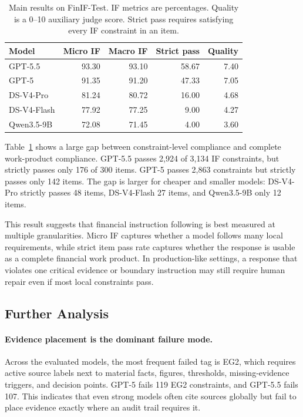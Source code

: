 \documentclass[11pt]{article}
\begin{document}
\begin{table}[t]
\centering
\small
\begin{tabular}{lrrrr}
\toprule
Model & Micro IF & Macro IF & Strict pass & Quality \\
\midrule
GPT-5.5 & 93.30 & 93.10 & 58.67 & 7.40 \\
GPT-5 & 91.35 & 91.20 & 47.33 & 7.05 \\
DS-V4-Pro & 81.24 & 80.72 & 16.00 & 4.68 \\
DS-V4-Flash & 77.92 & 77.25 & 9.00 & 4.27 \\
Qwen3.5-9B & 72.08 & 71.45 & 4.00 & 3.60 \\
\bottomrule
\end{tabular}
\caption{Main results on FinIF-Test. IF metrics are percentages. Quality is a 0--10 auxiliary judge score. Strict pass requires satisfying every IF constraint in an item.}
\label{tab:main}
\end{table}

Table~\ref{tab:main} shows a large gap between constraint-level compliance and complete work-product compliance. GPT-5.5 passes 2,924 of 3,134 IF constraints, but strictly passes only 176 of 300 items. GPT-5 passes 2,863 constraints but strictly passes only 142 items. The gap is larger for cheaper and smaller models: DS-V4-Pro strictly passes 48 items, DS-V4-Flash 27 items, and Qwen3.5-9B only 12 items.

This result suggests that financial instruction following is best measured at multiple granularities. Micro IF captures whether a model follows many local requirements, while strict item pass rate captures whether the response is usable as a complete financial work product. In production-like settings, a response that violates one critical evidence or boundary instruction may still require human repair even if most local constraints pass.

\subsection{Further Analysis}

\paragraph{Evidence placement is the dominant failure mode.}
Across the evaluated models, the most frequent failed tag is EG2, which requires active source labels next to material facts, figures, thresholds, missing-evidence triggers, and decision points. GPT-5 fails 119 EG2 constraints, and GPT-5.5 fails 107. This indicates that even strong models often cite sources globally but fail to place evidence exactly where an audit trail requires it.
\end{document}

